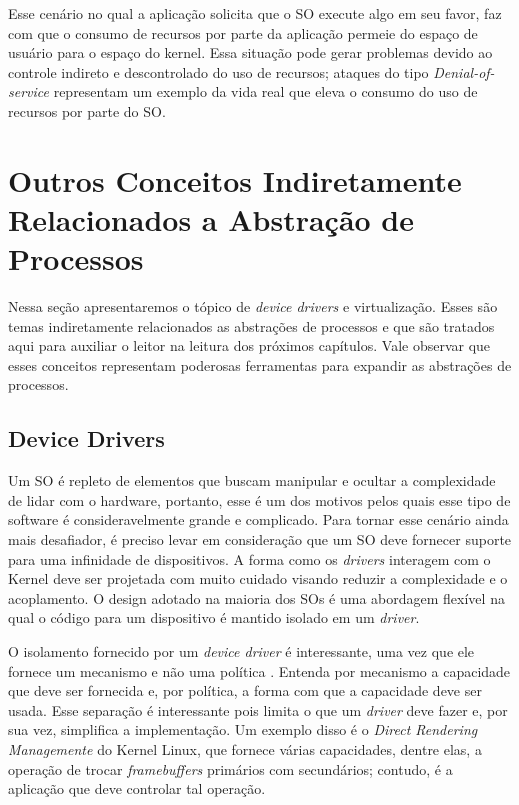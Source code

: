 Esse cenário no qual a aplicação solicita que o SO execute algo em seu favor,
faz com que o consumo de recursos por parte da aplicação permeie do espaço de
usuário para o espaço do kernel. Essa situação pode gerar problemas devido ao
controle indireto e descontrolado do uso de recursos; ataques do tipo
\emph{Denial-of-service} representam um exemplo da vida real que eleva o
consumo do uso de recursos por parte do SO.

\section{Outros Conceitos Indiretamente Relacionados a Abstração de Processos}

Nessa seção apresentaremos o tópico de \emph{device drivers} e virtualização.
Esses são temas indiretamente relacionados as abstrações de processos e que são
tratados aqui para auxiliar o leitor na leitura dos próximos capítulos. Vale
observar que esses conceitos representam poderosas ferramentas para expandir as
abstrações de processos.

\subsection{Device Drivers}
\label{sec:dd}

Um SO é repleto de elementos que buscam manipular e ocultar a complexidade de
lidar com o hardware, portanto, esse é um dos motivos pelos quais esse tipo de
software é consideravelmente grande e complicado. Para tornar esse cenário
ainda mais desafiador, é preciso levar em consideração que um SO deve fornecer
suporte para uma infinidade de dispositivos. A forma como os \emph{drivers}
interagem com o Kernel deve ser projetada com muito cuidado visando reduzir a
complexidade e o acoplamento. O design adotado na maioria dos SOs é uma
abordagem flexível na qual o código para um dispositivo é mantido isolado em um
\emph{driver}.

O isolamento fornecido por um \emph{device driver} é interessante, uma vez que
ele fornece um mecanismo e não uma política \citep{ddbook}. Entenda por
mecanismo a capacidade que deve ser fornecida e, por política, a forma com
que a capacidade deve ser usada. Esse separação é interessante pois limita o
que um \emph{driver} deve fazer e, por sua vez, simplifica a implementação. Um
exemplo disso é o \emph{Direct Rendering Managemente} do Kernel Linux, que
fornece várias capacidades, dentre elas, a operação de trocar
\emph{framebuffers} primários com secundários; contudo, é a aplicação que deve
controlar tal operação.

